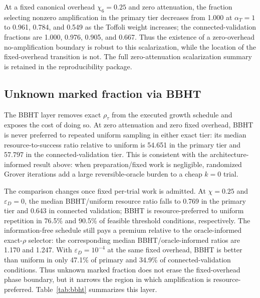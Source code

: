 \documentclass[5p,times]{elsarticle}
\begin{document}
At a fixed canonical overhead $\chi_6=0.25$ and zero attenuation, the fraction selecting nonzero amplification in the primary tier decreases from 1.000 at $\alpha_T=1$ to 0.961, 0.784, and 0.549 as the Toffoli weight increases; the connected-validation fractions are 1.000, 0.976, 0.905, and 0.667. Thus the existence of a zero-overhead no-amplification boundary is robust to this scalarization, while the location of the fixed-overhead transition is not. The full zero-attenuation scalarization summary is retained in the reproducibility package.



\subsection{Unknown marked fraction via BBHT}
The BBHT layer removes exact $\rho_\tau$ from the executed growth schedule and exposes the cost of doing so. At zero attenuation and zero fixed overhead, BBHT is never preferred to repeated uniform sampling in either exact tier: its median resource-to-success ratio relative to uniform is 54.651 in the primary tier and 57.797 in the connected-validation tier. This is consistent with the architecture-informed result above: when preparation/fixed work is negligible, randomized Grover iterations add a large reversible-oracle burden to a cheap $k=0$ trial.

The comparison changes once fixed per-trial work is admitted. At $\chi=0.25$ and $\varepsilon_D=0$, the median BBHT/uniform resource ratio falls to 0.769 in the primary tier and 0.643 in connected validation; BBHT is resource-preferred to uniform repetition in 76.5\% and 90.5\% of feasible threshold conditions, respectively. The information-free schedule still pays a premium relative to the oracle-informed exact-$\rho$ selector: the corresponding median BBHT/oracle-informed ratios are 1.170 and 1.247. With $\varepsilon_D=10^{-4}$ at the same fixed overhead, BBHT is better than uniform in only 47.1\% of primary and 34.9\% of connected-validation conditions. Thus unknown marked fraction does not erase the fixed-overhead phase boundary, but it narrows the region in which amplification is resource-preferred. Table~\ref{tab:bbht} summarizes this layer.

\begin{table}[t]
\centering
\caption{BBHT unknown-solution-count comparison. BBHT/uniform and BBHT/oracle are expected logical resource-to-success ratios. The BBHT schedule does not receive $\rho_\tau$; exact $\rho_\tau$ is used only for retrospective expected-cost evaluation.}
\label{tab:bbht}

\end{table}
\end{document}
